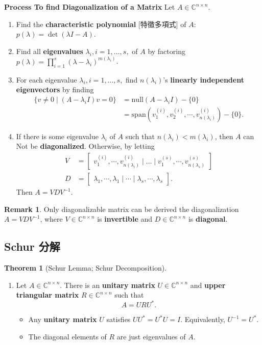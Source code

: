 \documentclass{article}
\theoremstyle{definition}
\newtheorem{theorem}{Theorem}[section]
\newtheorem{remark}{Remark}
\numberwithin{theorem}{section}
\numberwithin{equation}{section}
\begin{document}
\textbf{Process To find Diagonalization of a Matrix}
Let $A \in \mathbb{C}^{n \times n}$.
\begin{enumerate}
\item Find the \textbf{characteristic polynomial} [特徵多項式] of $A$: $p(\lambda) = \det(\lambda I - A)$.
\item Find all \textbf{eigenvalues} $\lambda_i, i=1,\ldots,s,$ of $A$ by factoring $p(\lambda) = \prod\limits_{i=1}^{s} (\lambda - \lambda_i)^{m(\lambda_i)}$.
\item For each eigenvalue $\lambda_i, i=1,\ldots,s,$ find $n(\lambda_i)$'s \textbf{linearly independent eigenvectors} by finding
   \begin{align*}
   \{ v \neq 0 \mid (A-\lambda_i I) v =0 \} &= \text{null}( A-\lambda_i I )- \{ 0 \}\\
   &= \text{span}( v^{(i)}_1, v^{(i)}_2, \cdots, v^{(i)}_{n(\lambda_i)} ) - \{ 0 \}.
   \end{align*}
\item If there is some eigenvalue $\lambda_i$ of $A$ such that $n(\lambda_i) < m(\lambda_i)$, then $A$ can Not be \textbf{diagonalized}. Otherwise, by letting
   \begin{align*}
   V &= \begin{bmatrix}
   v^{(i)}_1, \cdots, v^{(i)}_{n(\lambda_i)} \mid\ldots \mid
   v^{(s)}_1, \cdots, v^{(s)}_{n(\lambda_s)}
   \end{bmatrix}\\
   D &= \begin{bmatrix}
   \lambda_1, \cdots, \lambda_1\mid \cdots \mid \lambda_s, \cdots, \lambda_s
   \end{bmatrix}.
   \end{align*}
  Then $A=VDV^{-1}$.
\end{enumerate}

\begin{remark}
    Only diagonalizable matrix can be derived the diagonalization $A=VDV^{-1}$, where $V\in \mathbb{C}^{n \times n}$ is \textbf{invertible} and $D\in \mathbb{C}^{n \times n}$ is \textbf{diagonal}.
\end{remark}

\subsection{Schur 分解}

\begin{theorem}[Schur Lemma; Schur Decomposition]
    \begin{enumerate}
\item Let $A \in \mathbb{C}^{n \times n}$. There is an \textbf{unitary matrix} $U\in \mathbb{C}^{n \times n}$ and \textbf{upper triangular matrix} $R\in \mathbb{C}^{n \times n}$ such that
  \[
   A= URU^*.
   \]
  \begin{itemize}
  \item Any \textbf{unitary matrix} $U$ satisfies $UU^*=U^*U=I$. Equivalently, $U^{-1}= U^*$.
  \item The diagonal elements of $R$ are just eigenvalues of $A$.
  \end{itemize}
\end{enumerate}
\end{theorem}
\end{document}
